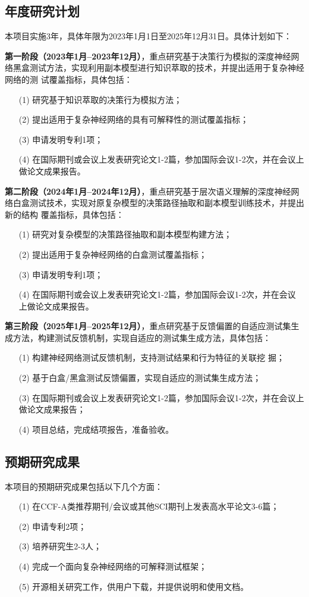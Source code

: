 \subsection{年度研究计划}
本项目实施3年，具体年限为2023年1月1日至2025年12月31日。具体计划如下：

\textbf{第一阶段（2023年1月--2023年12月）}，重点研究基于决策行为模拟的深度神经网
络黑盒测试方法，实现利用副本模型进行知识萃取的技术，并提出适用于复杂神经网络的测
试覆盖指标，具体包括：
\begin{itemize}[itemindent=2em]
    \item[(1)] 研究基于知识萃取的决策行为模拟方法；
    \item[(2)] 提出适用于复杂神经网络的具有可解释性的测试覆盖指标；
    \item[(3)] 申请发明专利1项；
    \item[(4)] 在国际期刊或会议上发表研究论文1-2篇，参加国际会议1-2次，并在会议上
    做论文成果报告。
\end{itemize}

\textbf{第二阶段（2024年1月--2024年12月）}，重点研究基于层次语义理解的深度神经网
络白盒测试技术，实现对原复杂模型的决策路径抽取和副本模型训练技术，并提出新的结构
覆盖指标，具体包括：
\begin{itemize}[itemindent=2em]
    \item[(1)] 研究对复杂模型的决策路径抽取和副本模型构建方法；
    \item[(2)] 提出适用于复杂神经网络的白盒测试覆盖指标；
    \item[(3)] 申请发明专利1项；
    \item[(4)] 在国际期刊或会议上发表研究论文1-2篇，参加国际会议1-2次，并在会议
    上做论文成果报告。
\end{itemize}

\textbf{第三阶段（2025年1月--2025年12月）}，重点研究基于反馈偏置的自适应测试集生
成方法，构建测试反馈机制，实现自适应的测试集生成方法，具体包括：
\begin{itemize}[itemindent=2em]
    \item[(1)] 构建神经网络测试反馈机制，支持测试结果和行为特征的关联挖
    掘；
    \item[(2)] 基于白盒/黑盒测试反馈偏置，实现自适应的测试集生成方法；
    \item[(3)] 在国际期刊或会议上发表研究论文1-2篇，参加国际会议1-2次，并在会议上
    做论文成果报告；
    \item[(4)] 项目总结，完成结项报告，准备验收。
\end{itemize}

\subsection{预期研究成果}

本项目的预期研究成果包括以下几个方面：
\begin{itemize}[itemindent=2em]
    \item[(1)] 在CCF-A类推荐期刊/会议或其他SCI期刊上发表高水平论文3-6篇；
    \item[(2)] 申请专利2项；
    \item[(3)] 培养研究生2-3人；
    \item[(4)] 完成一个面向复杂神经网络的可解释测试框架；
    \item[(5)] 开源相关研究工作，供用户下载，并提供说明和使用文档。
\end{itemize}

